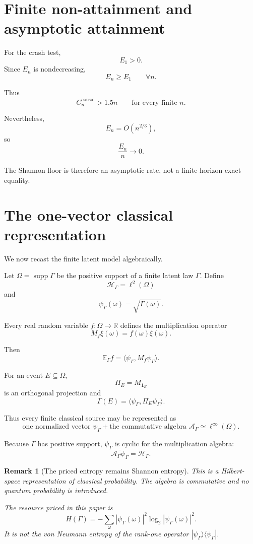\documentclass[11pt,a4paper]{article}
\newtheorem{remark}[theorem]{Remark}
\newcommand{\supp}{\operatorname{supp}}
\newcommand{\Ccausal}{C^{\mathrm{causal}}}
\newcommand{\cA}{\mathcal A}
\newcommand{\cH}{\mathcal H}
\newcommand{\E}{\mathbb E}
\newcommand{\R}{\mathbb R}
\newcommand{\1}{\mathbf 1}
\newcommand{\ip}[2]{\langle #1,#2\rangle}
\begin{document}
\section{Finite non-attainment and asymptotic attainment}

For the crash test,
\[
E_1>0.
\]
Since \(E_n\) is nondecreasing,
\[
E_n\ge E_1
\qquad
\forall n.
\tag{19.1}
\]

Thus
\[
\boxed{
\Ccausal_n>1.5n
\qquad
\text{for every finite }n.
}
\tag{19.2}
\]

Nevertheless,
\[
E_n=O(n^{2/3}),
\]
so
\[
\frac{E_n}{n}\to0.
\tag{19.3}
\]

The Shannon floor is therefore an asymptotic rate, not a finite-horizon
exact equality.


\section{The one-vector classical representation}
\label{sec:onevector}

We now recast the finite latent model algebraically.

Let \(\Omega=\supp\Gamma\) be the positive support of a finite latent
law \(\Gamma\).
Define
\[
\cH_\Gamma=\ell^2(\Omega)
\]
and
\[
\boxed{
\psi_\Gamma(\omega)=\sqrt{\Gamma(\omega)}.
}
\tag{20.1}
\]

Every real random variable \(f:\Omega\to\R\) defines the multiplication
operator
\[
M_f\xi(\omega)
=
f(\omega)\xi(\omega).
\tag{20.2}
\]

Then
\[
\boxed{
\E_\Gamma f
=
\ip{\psi_\Gamma}{M_f\psi_\Gamma}.
}
\tag{20.3}
\]

For an event \(E\subseteq\Omega\),
\[
\Pi_E=M_{\1_E}
\]
is an orthogonal projection and
\[
\boxed{
\Gamma(E)
=
\ip{\psi_\Gamma}{\Pi_E\psi_\Gamma}.
}
\tag{20.4}
\]

Thus every finite classical source may be represented as
\[
\boxed{
\text{one normalized vector }\psi_\Gamma
+
\text{the commutative algebra }
\cA_\Gamma\simeq\ell^\infty(\Omega).
}
\tag{20.5}
\]

Because \(\Gamma\) has positive support, \(\psi_\Gamma\) is cyclic for
the multiplication algebra:
\[
\overline{\cA_\Gamma\psi_\Gamma}
=
\cH_\Gamma.
\tag{20.6}
\]

\begin{remark}[The priced entropy remains Shannon entropy]
This is a Hilbert-space representation of classical probability.
The algebra is commutative and no quantum probability is introduced.

The resource priced in this paper is
\[
H(\Gamma)
=
-\sum_\omega
|\psi_\Gamma(\omega)|^2
\log_2|\psi_\Gamma(\omega)|^2.
\tag{20.7}
\]
It is not the von Neumann entropy of the rank-one operator
\(
|\psi_\Gamma\rangle\langle\psi_\Gamma|
\).
\end{remark}
\end{document}
